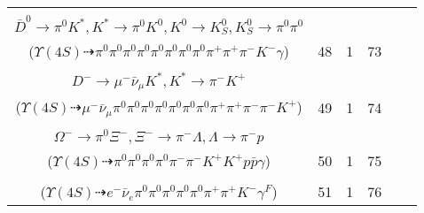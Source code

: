 \documentclass[landscape]{article}
\newcounter{rownumbers}
\newcommand\rn{\stepcounter{rownumbers}\arabic{rownumbers}}
\newcommand{\EOLP}{\\ \hline} %
\newcommand{\topoTags}[1]{#1} %
\begin{document}
\begin{longtable}{clcccc}
\rn & \makecell[l]{ $ 
\Upsilon(4S) \rightarrow B^{0} \bar{B}^{0} ,
B^{0} \rightarrow \pi^{0} \bar{D}^{0} ,
\bar{B}^{0} \rightarrow \pi^{0} \pi^{-} D^{+} \bar{D}^{*0} ,
\bar{D}^{0} \rightarrow \pi^{0} \pi^{0} ,
D^{+} \rightarrow \pi^{+} \pi^{+} K^{-} ,
\bar{D}^{*0} \rightarrow \bar{D}^{0} \gamma ,
$ \\ $
\bar{D}^{0} \rightarrow \pi^{0} K^{*} ,
K^{*} \rightarrow \pi^{0} K^{0} ,
K^{0} \rightarrow K_{S}^{0} ,
K_{S}^{0} \rightarrow \pi^{0} \pi^{0} 
$ \\ ($
\Upsilon(4S) \dashrightarrow \pi^{0} \pi^{0} \pi^{0} \pi^{0} \pi^{0} \pi^{0} \pi^{0} \pi^{0} \pi^{+} \pi^{+} \pi^{-} K^{-} \gamma 
$) } & \topoTags{48 & }1 & 73 \EOLP

\rn & \makecell[l]{ $ 
\Upsilon(4S) \rightarrow B^{0} B^{0} ,
B^{0} \rightarrow \pi^{0} \bar{D}^{0} ,
B^{0} \rightarrow \pi^{0} \pi^{0} \pi^{-} \rho^{+} \rho^{+} D^{-} ,
\bar{D}^{0} \rightarrow \pi^{0} \pi^{0} ,
\rho^{+} \rightarrow \pi^{0} \pi^{+} ,
\rho^{+} \rightarrow \pi^{0} \pi^{+} ,
$ \\ $
D^{-} \rightarrow \mu^{-} \bar{\nu}_{\mu} K^{*} ,
K^{*} \rightarrow \pi^{-} K^{+} 
$ \\ ($
\Upsilon(4S) \dashrightarrow \mu^{-} \bar{\nu}_{\mu} \pi^{0} \pi^{0} \pi^{0} \pi^{0} \pi^{0} \pi^{0} \pi^{0} \pi^{+} \pi^{+} \pi^{-} \pi^{-} K^{+} 
$) } & \topoTags{49 & }1 & 74 \EOLP

\rn & \makecell[l]{ $ 
\Upsilon(4S) \rightarrow B^{0} \bar{B}^{0} ,
B^{0} \rightarrow \pi^{0} \bar{D}^{0} ,
\bar{B}^{0} \rightarrow K^{+} \bar{p} \Xi_{c}^{\prime0} ,
\bar{D}^{0} \rightarrow \pi^{0} \pi^{0} ,
\Xi_{c}^{\prime0} \rightarrow \Xi_{c}^{0} \gamma ,
\Xi_{c}^{0} \rightarrow K^{+} \Omega^{-} ,
$ \\ $
\Omega^{-} \rightarrow \pi^{0} \Xi^{-} ,
\Xi^{-} \rightarrow \pi^{-} \Lambda ,
\Lambda \rightarrow \pi^{-} p 
$ \\ ($
\Upsilon(4S) \dashrightarrow \pi^{0} \pi^{0} \pi^{0} \pi^{0} \pi^{-} \pi^{-} K^{+} K^{+} p \bar{p} \gamma 
$) } & \topoTags{50 & }1 & 75 \EOLP

\rn & \makecell[l]{ $ 
\Upsilon(4S) \rightarrow B^{0} \bar{B}^{0} ,
B^{0} \rightarrow \pi^{0} \bar{D}^{0} ,
\bar{B}^{0} \rightarrow e^{-} \bar{\nu}_{e} \pi^{+} D^{*0} ,
\bar{D}^{0} \rightarrow \pi^{0} \pi^{0} ,
D^{*0} \rightarrow \pi^{0} D^{0} ,
D^{0} \rightarrow \pi^{0} \pi^{+} K^{-} \gamma^{F} 
$ \\ ($
\Upsilon(4S) \dashrightarrow e^{-} \bar{\nu}_{e} \pi^{0} \pi^{0} \pi^{0} \pi^{0} \pi^{0} \pi^{+} \pi^{+} K^{-} \gamma^{F} 
$) } & \topoTags{51 & }1 & 76 \EOLP


\end{longtable}
\end{document}
